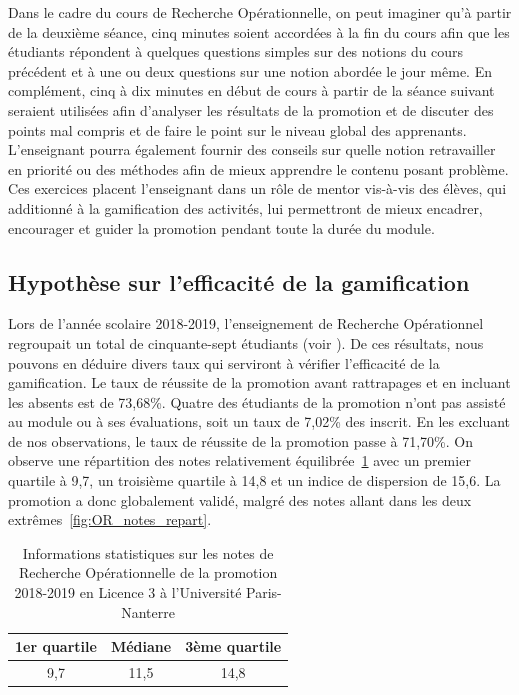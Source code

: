 Dans le cadre du cours de Recherche Opérationnelle, on peut imaginer qu'à partir de la deuxième séance, cinq minutes soient accordées à la fin du cours afin que les étudiants répondent à quelques questions simples sur des notions du cours précédent et à une ou deux questions sur une notion abordée le jour même. En complément, cinq à dix minutes en début de cours à partir de la séance suivant seraient utilisées afin d'analyser les résultats de la promotion et de discuter des points mal compris et de faire le point sur le niveau global des apprenants. L'enseignant pourra également fournir des conseils sur quelle notion retravailler en priorité ou des méthodes afin de mieux apprendre le contenu posant problème. Ces exercices placent l'enseignant dans un rôle de mentor vis-à-vis des élèves, qui additionné à la gamification des activités, lui permettront de mieux encadrer, encourager et guider la promotion pendant toute la durée du module.

\subsection{Hypothèse sur l'efficacité de la gamification}
Lors de l'année scolaire 2018-2019, l'enseignement de Recherche Opérationnel regroupait un total de cinquante-sept étudiants (voir ). De ces résultats, nous pouvons en déduire divers taux qui serviront à vérifier l'efficacité de la gamification. Le taux de réussite de la promotion avant rattrapages et en incluant les absents est de 73,68\%. Quatre des étudiants de la promotion n'ont pas assisté au module ou à ses évaluations, soit un taux de 7,02\% des inscrit. En les excluant de nos observations, le taux de réussite de la promotion passe à 71,70\%. On observe une répartition des notes relativement équilibrée~\ref{tab:OR_notes_stats} avec un premier quartile à 9,7, un troisième quartile à 14,8 et un indice de dispersion de 15,6. La promotion a donc globalement validé, malgré des notes allant dans les deux extrêmes~\ref{fig:OR_notes_repart}. \par

\begin{table}
    \begin{center}
        \begin{tabular}{|c|c|c|}
        \hline
        \textbf{1er quartile} & \textbf{Médiane} & \textbf{3ème quartile} \\ \hline
        9,7                   & 11,5             & 14,8                   \\ \hline
        \end{tabular}
        \label{tab:OR_notes_stats}
        \caption{Informations statistiques sur les notes de Recherche Opérationnelle de la promotion 2018-2019 en Licence 3 à l'Université Paris-Nanterre}
    \end{center}
\end{table}

